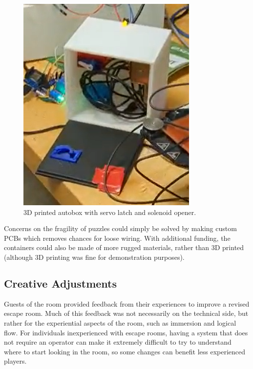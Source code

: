\documentclass[conference]{IEEEtran}
\begin{document}
\begin{figure}[ht]
    \centering
    \includegraphics[width=0.90\columnwidth]{Images/autobox_low_res.png}
    \caption{3D printed autobox with servo latch and solenoid opener.}
    \label{fig:pir}
\end{figure}

\indent Concerns on the fragility of puzzles could simply be solved by making custom PCBs which removes chances for 
loose wiring. With additional funding, the containers could also be made of more rugged materials, rather than 3D 
printed (although 3D printing was fine for demonstration purposes).

\subsection{Creative Adjustments}
\indent Guests of the room provided feedback from their experiences to improve a revised escape room. Much of this feedback was 
not necessarily on the technical side, but rather for the experiential aspects of the room, such as immersion and logical 
flow. For individuals inexperienced with escape rooms, having a system that does not require an operator can make it extremely 
difficult to try to understand where to start looking in the room, so some changes can benefit less experienced players.
\end{document}
